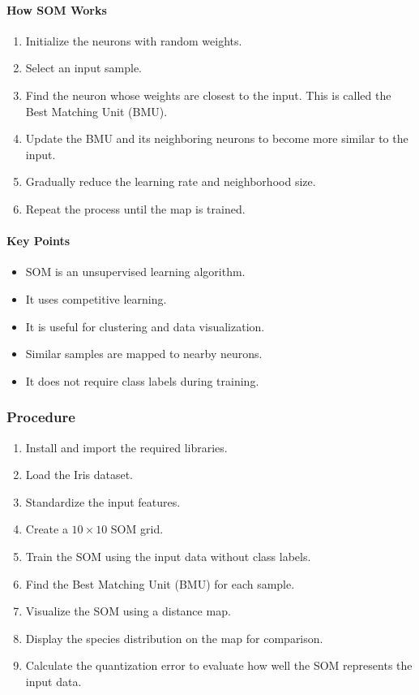 \documentclass[a4paper,11pt]{article}
\begin{document}
\begin{itemize}
\paragraph{How SOM Works}
\begin{enumerate}
    \item Initialize the neurons with random weights.
    \item Select an input sample.
    \item Find the neuron whose weights are closest to the input. This is called the Best Matching Unit (BMU).
    \item Update the BMU and its neighboring neurons to become more similar to the input.
    \item Gradually reduce the learning rate and neighborhood size.
    \item Repeat the process until the map is trained.
\end{enumerate}

\paragraph{Key Points}
\begin{itemize}
    \item SOM is an unsupervised learning algorithm.
    \item It uses competitive learning.
    \item It is useful for clustering and data visualization.
    \item Similar samples are mapped to nearby neurons.
    \item It does not require class labels during training.
\end{itemize}

\subsubsection{Procedure}
\begin{enumerate}
    \item Install and import the required libraries.
    \item Load the Iris dataset.
    \item Standardize the input features.
    \item Create a $10 \times 10$ SOM grid.
    \item Train the SOM using the input data without class labels.
    \item Find the Best Matching Unit (BMU) for each sample.
    \item Visualize the SOM using a distance map.
    \item Display the species distribution on the map for comparison.
    \item Calculate the quantization error to evaluate how well the SOM represents the input data.
\end{enumerate}


\end{itemize}
\end{document}
